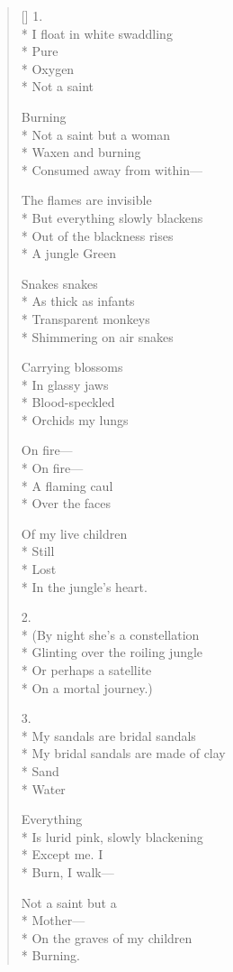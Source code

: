 \label{ch:neardeath}
\settowidth{\versewidth}{My bridal sandals are made of clay}
\begin{verse}[\versewidth]
1.\\*
I float in white swaddling\\*
Pure\\*
Oxygen\\*
Not a saint

Burning\\*
Not a saint but a woman\\*
Waxen and burning\\*
Consumed away from within---

The flames are invisible\\*
But everything slowly blackens\\*
Out of the blackness rises\\*
A jungle \quad Green

Snakes   snakes\\*
As thick as infants\\*
Transparent monkeys\\*
Shimmering on air \quad snakes

Carrying blossoms\\*
In glassy jaws\\*
Blood-speckled\\*
Orchids \quad my lungs

On fire---\\*
On fire---\\*
A flaming caul\\*
Over the faces

Of my live children\\*
Still\\*
Lost\\*
In the jungle's heart.


2.\\*
(By night she's a constellation\\*
Glinting over the roiling jungle\\*
Or perhaps a satellite\\*
On a mortal journey.)

3.\\*
My sandals are bridal sandals\\*
My bridal sandals are made of clay\\*
Sand\\*
Water

Everything\\*
Is lurid pink, slowly blackening\\*
Except me.  I\\*
Burn, I walk---

Not a saint but a\\*
Mother---\\*
On the graves of my children\\*
Burning.
\end{verse}
